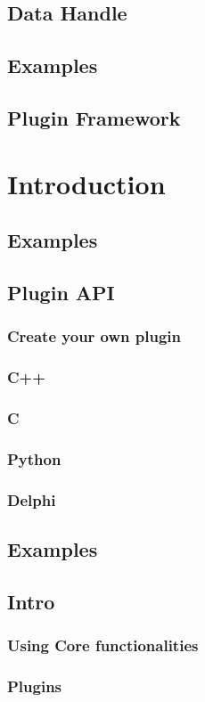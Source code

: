 \documentclass[12pt, letter, oneside]{book}
\begin{document}
\subsection{Data Handle}
\subsection{Examples}
\subsection{Plugin Framework }
\section{Introduction}
\subsection{Examples}
\subsection{Plugin API}
\subsubsection{Create your own plugin}
\subsubsection{C++}
\subsubsection{C}
\subsubsection{Python}
\subsubsection{Delphi}
\subsection{Examples}
\subsection{Intro}
\subsubsection{Using Core functionalities}
\subsubsection{Plugins}
\end{document}
